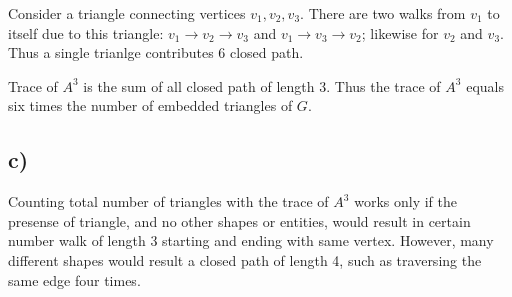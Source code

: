 \documentclass[12pt]{article}
\begin{document}
Consider a triangle connecting vertices $v_1, v_2, v_3$. There are two walks from $v_1$ to itself due to this triangle: $v_1 \rightarrow v_2 \rightarrow v_3$ and $v_1 \rightarrow v_3 \rightarrow v_2$; likewise for $v_2$ and $v_3$. Thus a single trianlge contributes 6 closed path.

Trace of $A^3$ is the sum of all closed path of length 3. Thus the trace of $A^3$ equals six times the number of embedded triangles of $G$.


\subsection*{c)}

Counting total number of triangles with the trace of $A^3$ works only if the presense of triangle, and no other shapes or entities, would result in certain number walk of length 3 starting and ending with same vertex. However, many different shapes would result a closed path of length 4, such as traversing the same edge four times.
\end{document}
